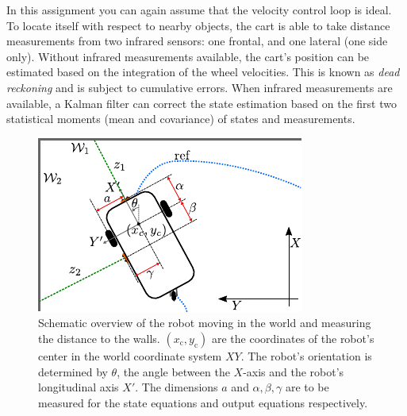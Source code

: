 \documentclass[10pt,a4paper]{article}
\begin{document}
In this assignment you can again assume that the velocity control loop is ideal.
To locate itself with respect to nearby objects, the cart is able to take distance measurements from two infrared sensors: one frontal, and one lateral (one side only).
Without infrared measurements available, the cart's position can be  estimated based on the integration of the wheel velocities. This is known as  \textit{dead reckoning} and is subject to cumulative errors. When infrared measurements are available, a Kalman filter can correct the state estimation based on the first two statistical moments (mean and covariance) of states and measurements.

\begin{figure}[h]
\centering
\includegraphics[scale=1.8]{figures/illustration_kalman.pdf}
\caption{Schematic overview of the robot moving in the world and measuring the distance to the walls. $(x_{\mathrm{c}},y_{\mathrm{c}})$ are the coordinates of the robot's center in the world coordinate system $XY$. The robot's orientation is determined by $\theta$, the angle between the $X$-axis and the robot's longitudinal axis $X'$. The dimensions $a$ and $\alpha,\beta,\gamma$ are to be measured for the state equations and output equations respectively.}
\label{fig:cartkalman}
\end{figure}
\end{document}
